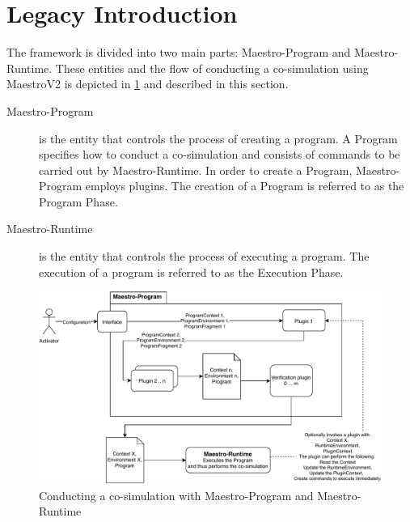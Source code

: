 \section{Legacy Introduction}\label{sec:legacy_intro}
The framework is divided into two main parts: Maestro-Program and
Maestro-Runtime. These entities and the flow of conducting a co-simulation using
MaestroV2 is depicted in \cref{fig:conducting_co-simulation-overview} and
described in this section.

\begin{description}
  \item[Maestro-Program] is the entity that controls the process of creating a
program. A Program specifies how to conduct a co-simulation and consists of
commands to be carried out by Maestro-Runtime. In order to create a Program,
Maestro-Program employs plugins. The creation of a Program is referred to as the
Program Phase.
  \item[Maestro-Runtime] is the entity that controls the process of executing a
program. The execution of a program is referred to as the Execution Phase.

\end{description}
\begin{figure}[htb] \centering
\includegraphics[width=\textwidth]{figures/conducting_co-simulation_overview.pdf}
  \caption{Conducting a co-simulation with Maestro-Program and Maestro-Runtime}
  \label{fig:conducting_co-simulation-overview}
\end{figure}

